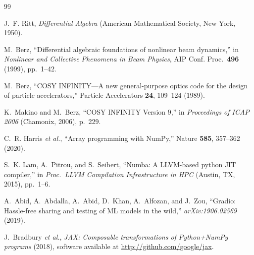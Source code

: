\documentclass[aps,prb,reprint,superscriptaddress,nofootinbib]{revtex4-2}
\begin{document}

\begin{thebibliography}{99}

J.~F. Ritt, \emph{Differential Algebra} (American Mathematical Society, New York, 1950).

M.~Berz, ``Differential algebraic foundations of nonlinear beam dynamics,''
in \emph{Nonlinear and Collective Phenomena in Beam Physics}, AIP Conf. Proc.\ \textbf{496} (1999), pp.\ 1--42.

M.~Berz, ``COSY INFINITY---A new general-purpose optics code for the design of particle accelerators,''
Particle Accelerators \textbf{24}, 109--124 (1989).

K.~Makino and M.~Berz, ``COSY INFINITY Version 9,''
in \emph{Proceedings of ICAP 2006} (Chamonix, 2006), p.\ 229.

C.~R. Harris \textit{et al.}, ``Array programming with {NumPy},''
Nature \textbf{585}, 357--362 (2020).

S.~K. Lam, A.~Pitrou, and S.~Seibert, ``Numba: A LLVM-based python JIT compiler,''
in \emph{Proc.\ LLVM Compilation Infrastructure in HPC} (Austin, TX, 2015), pp.\ 1--6.

A.~Abid, A.~Abdalla, A.~Abid, D.~Khan, A.~Alfozan, and J.~Zou, ``Gradio: Hassle-free sharing and testing of ML models in the wild,''
\textit{arXiv:1906.02569} (2019).

J.~Bradbury \textit{et al.}, \emph{JAX: Composable transformations of Python+NumPy programs} (2018), software available at \url{http://github.com/google/jax}.

\end{thebibliography}
\end{document}
